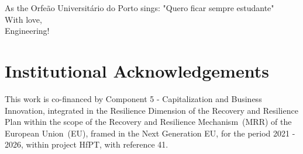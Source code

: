 As the Orfeão Universitário do Porto sings: "Quero ficar sempre estudante"\\
With love,\\
Engineering!

\vspace{10mm}

\chapter*{Institutional Acknowledgements}

This work is co-financed by Component 5 - Capitalization and Business Innovation, integrated in the Resilience Dimension of the Recovery and Resilience Plan within the scope of the Recovery and Resilience Mechanism~(MRR) of the European Union~(EU), framed in the Next Generation EU, for the period 2021 - 2026, within project HfPT, with reference 41.

\vspace{10mm}
